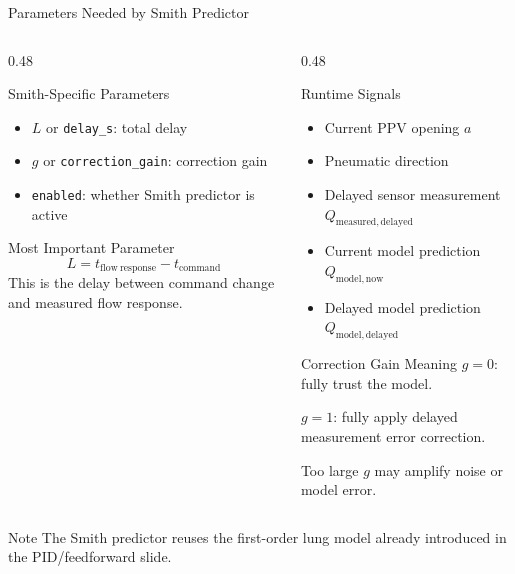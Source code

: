 \documentclass[aspectratio=169,10pt]{beamer}
\newcommand{\code}[1]{\texttt{\small #1}}
\begin{document}
\begin{frame}[shrink=8]{Parameters Needed by Smith Predictor}
  \begin{columns}[T,onlytextwidth]
    \begin{column}{0.48\textwidth}
      \begin{block}{Smith-Specific Parameters}
        \begin{itemize}
          \item $L$ or \code{delay\_s}: total delay
          \item $g$ or \code{correction\_gain}: correction gain
          \item \code{enabled}: whether Smith predictor is active
        \end{itemize}
      \end{block}

      \begin{block}{Most Important Parameter}
        \[
          L =
          t_{\mathrm{flow\ response}}
          -
          t_{\mathrm{command}}
        \]
        This is the delay between command change and measured flow response.
      \end{block}
    \end{column}
    \begin{column}{0.48\textwidth}
      \begin{block}{Runtime Signals}
        \begin{itemize}
          \item Current PPV opening $a$
          \item Pneumatic direction
          \item Delayed sensor measurement $Q_{\mathrm{measured,delayed}}$
          \item Current model prediction $Q_{\mathrm{model,now}}$
          \item Delayed model prediction $Q_{\mathrm{model,delayed}}$
        \end{itemize}
      \end{block}

      \begin{block}{Correction Gain Meaning}
        $g=0$: fully trust the model.

        $g=1$: fully apply delayed measurement error correction.

        Too large $g$ may amplify noise or model error.
      \end{block}
    \end{column}
  \end{columns}

  \vspace{0.1em}
  \begin{block}{Note}
    The Smith predictor reuses the first-order lung model already introduced in the PID/feedforward slide.
  \end{block}
\end{frame}
\end{document}
